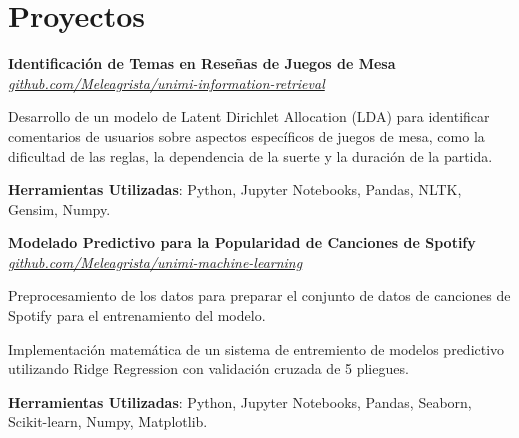 \section{Proyectos}

\begin{onecolentry}
    \textbf{Identificación de Temas en Reseñas de Juegos de Mesa} \\
    \textit{\href{https://github.com/Meleagrista/unimi-information-retrieval}{github.com/Meleagrista/unimi-information-retrieval}}
\end{onecolentry}

\vspace{0.20 cm}
\begin{onecolentry}
    \begin{highlights}
        \item Desarrollo de un modelo de Latent Dirichlet Allocation (LDA) para identificar comentarios de usuarios sobre aspectos específicos de juegos de mesa, como la dificultad de las reglas, la dependencia de la suerte y la duración de la partida.
        \item \textbf{Herramientas Utilizadas}: Python, Jupyter Notebooks, Pandas, NLTK, Gensim, Numpy.
    \end{highlights}
\end{onecolentry}

\vspace{0.3 cm}

\begin{onecolentry}
    \textbf{Modelado Predictivo para la Popularidad de Canciones de Spotify} \\
    \textit{\href{https://github.com/Meleagrista/unimi-machine-learning}{github.com/Meleagrista/unimi-machine-learning}}
\end{onecolentry}

\vspace{0.20 cm}
\begin{onecolentry}
    \begin{highlights}        
        \item Preprocesamiento de los datos para preparar el conjunto de datos de canciones de Spotify para el entrenamiento del modelo.
        \item Implementación matemática de un sistema de entremiento de modelos predictivo utilizando Ridge Regression con validación cruzada de 5 pliegues.
        \item \textbf{Herramientas Utilizadas}: Python, Jupyter Notebooks, Pandas, Seaborn, Scikit-learn, Numpy, Matplotlib.
    \end{highlights}
\end{onecolentry}


